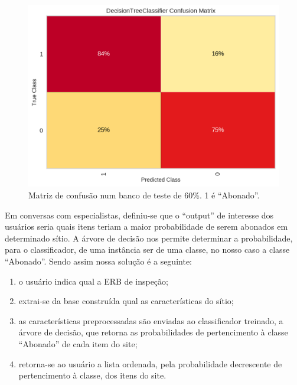 \documentclass[
	12pt,				%
	openany,			%
	oneside,			%
	a4paper,			%
	english,			%
	french,				%
	spanish,			%
	brazil,				%
	]{abntex2}
\begin{document}
 \begin{figure}[h]
   \centering
  \includegraphics[scale=0.6]{img/confusionmatrix1.png}
  \caption{Matriz de confusão num banco de teste de 60\%. 1 é ``Abonado''.}
  \label{ref:figmatriz}
\end{figure}



Em conversas com especialistas, definiu-se que o ``output'' de interesse dos
usuários seria quais itens teriam a maior probabilidade de serem abonados em
determinado sítio. A árvore de decisão nos permite determinar a probabilidade,
para o classificador, de uma instância ser de uma classe, no nosso caso a classe
``Abonado''. Sendo assim nossa solu\c{c}ão é a seguinte:

\begin{enumerate}
\item o usuário indica qual a ERB de inspe\c{c}ão;
\item extrai-se da base construída qual as características do sítio;
\item as características preprocessadas são enviadas ao classificador treinado,
  a árvore de decisão, que retorna as probabilidades de pertencimento à classe
  ``Abonado'' de cada item do site;
  \item retorna-se ao usuário a lista ordenada, pela probabilidade decrescente
    de pertencimento à classe, dos itens do site.
\end{enumerate}
\end{document}
